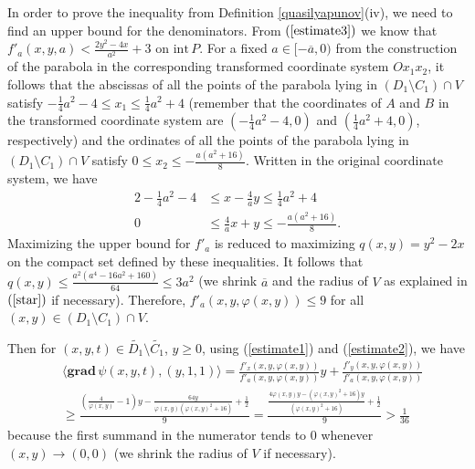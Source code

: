 \documentclass[a4paper]{article}
\begin{document}
In order to prove the inequality from Definition \ref{quasilyapunov}(iv), we need to find an upper bound for the denominators. From $(\ref{estimate3})$ we know that $f'_a(x,y,a) < \frac{2y^2-4x}{a^2}+3$ on $\mathrm{int}\,P$. For a fixed $a \in [-\overline{a},0)$ from the construction of the parabola in the corresponding transformed coordinate system $Ox_1x_2$, it follows that the abscissas of all the points of the parabola lying in $(  {D_1} \setminus  {C_1} )\cap V$ satisfy $-\frac{1}{4}a^2-4 \le x_1 \le \frac{1}{4}a^2+4$ (remember that the coordinates of $A$ and $B$ in the transformed coordinate system are $(-\frac{1}{4}a^2-4, 0)$ and $( \frac{1}{4}a^2+4, 0)$, respectively) and the ordinates of all the points of the parabola lying in $(  {D_1} \setminus  {C_1} )\cap V$ satisfy $0 \le x_2 \le -\frac{a(a^2+16)}{8}$. Written in the original coordinate system, we have
\begin{alignat*}{2}
    -\frac{1}{4}a^2-4 &\le x-\frac{4}{a}y \le \frac{1}{4}a^2+4\\
    0 &\le \frac{4}{a}x+y \le -\frac{a(a^2+16)}{8}.
\end{alignat*}
Maximizing the upper bound for $f'_a$ is reduced to maximizing $q(x,y)=y^2-2x$ on the compact set defined by these inequalities. It follows that $q(x,y) \le \frac{a^2(a^4-16a^2+160)}{64} \le 3a^2$   (we shrink $\overline{a}$ and the radius of $V$ as explained in $(\ref{star})$ if necessary). Therefore, $f'_a(x,y,\varphi(x,y)) \le 9$ for all $(x,y) \in (  {D_1} \setminus  {C_1} )\cap V$.

Then for $(x,y,t) \in \widetilde{D_1} \setminus \widetilde{C_1}$, $y \ge 0$, using (\ref{estimate1}) and (\ref{estimate2}), we have
\begin{equation}\label{grad1}
    \begin{aligned}
        &\langle \mathbf{grad} \,\psi(x,y,t), (y,1,1) \rangle = \frac{f'_x(x,y,\varphi(x,y))}{f'_a(x,y,\varphi(x,y))} y + \frac{f'_ y(x,y,\varphi(x,y))}{f'_a(x,y,\varphi(x,y))} \\&\ge \frac{\left(\frac{4}{\varphi(x,y)}-1\right)y - \frac{64y}{\varphi(x,y)(\varphi(x,y)^2+16)} + \frac{1}{2}}{9}= \frac{\frac{4\varphi(x,y)y - (\varphi(x,y)^2+16)y}{(\varphi(x,y)^2+16)}+\frac{1}{2}}{9} > \frac{1}{36}
    \end{aligned}
\end{equation}
because the first summand in the numerator tends to $0$ whenever $(x,y) \to (0,0)$  (we shrink the radius of $V$ if necessary).
\end{document}
